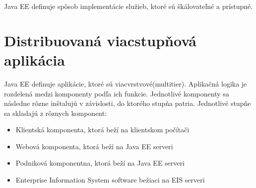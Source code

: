 \indent Java EE definuje spôsob implementácie služieb, ktoré sú škálovateľné a prístupné.

\section{Distribuovaná viacstupňová aplikácia}
Java EE definuje aplikácie, ktoré sú viacvrstvové(multitier). Aplikačná logika je rozdelená medzi komponenty podľa ich funkcie.\cite{Pravidla} Jednotlivé komponenty sa následne rôzne inštalujú v závislosti, do ktorého stupňa patria. Jednotlivé stupňe sa skladajú z rôznych komponent:
\begin{itemize}
\item Klientská komponenta, ktorá beží na klientskom počítači
\item Webová komponenta, ktorá beží na Java EE serveri
\item Podniková komponentna, ktorá beží na Java EE serveri
\item Enterprise Information System software bežiaci na EIS serveri
\end{itemize}

